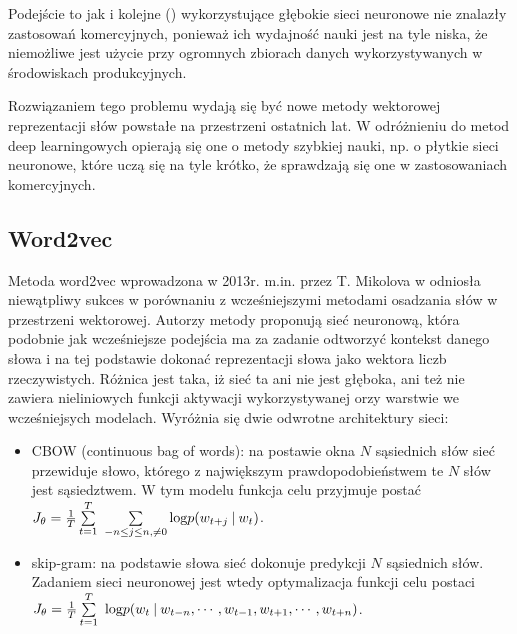 \documentclass[pl]{minipw} %
\begin{document}
Podejście to jak i kolejne (\cite{c_w}) wykorzystujące głębokie sieci neuronowe nie znalazły zastosowań komercyjnych, ponieważ ich wydajność nauki jest na tyle  niska, że niemożliwe jest użycie przy ogromnych zbiorach danych wykorzystywanych w środowiskach produkcyjnych.


Rozwiązaniem tego problemu wydają się być nowe metody wektorowej reprezentacji słów powstałe na przestrzeni ostatnich lat. W odróżnieniu do metod deep learningowych opierają się one o metody szybkiej nauki, np. o płytkie sieci neuronowe, które uczą się na tyle krótko, że sprawdzają się one w zastosowaniach komercyjnych.


\subsection{Word2vec}%

Metoda word2vec wprowadzona w 2013r. m.in. przez T. Mikolova w \cite{word2vec} odniosła niewątpliwy sukces w porównaniu z wcześniejszymi metodami osadzania słów w przestrzeni wektorowej. Autorzy metody proponują sieć neuronową, która podobnie jak wcześniejsze podejścia ma za zadanie odtworzyć kontekst danego słowa i na tej podstawie dokonać reprezentacji słowa jako wektora liczb rzeczywistych. Różnica jest taka, iż sieć ta ani nie jest głęboka, ani też nie zawiera nieliniowych funkcji aktywacji wykorzystywanej orzy warstwie we wcześniejsych modelach. Wyróżnia się dwie odwrotne architektury sieci:
\begin{itemize}
	\item CBOW (continuous bag of words): na postawie okna $N$ sąsiednich słów sieć przewiduje słowo, którego z największym prawdopodobieństwem te $N$ słów jest sąsiedztwem. W tym modelu funkcja celu przyjmuje postać $J_\theta = \frac{1}{T}\sum\limits_{t=1}^T\ \sum\limits_{-n \leq j \leq n , \neq 0} \text{log} \space p(w_{t+j} \: | \: w_t)$.
	\item skip-gram: na podstawie słowa sieć dokonuje predykcji $N$ sąsiednich słów. Zadaniem sieci neuronowej jest wtedy optymalizacja funkcji celu postaci $J_\theta = \frac{1}{T}\sum\limits_{t=1}^T\ \text{log} \space p(w_t \: | \: w_{t-n} , \cdots , w_{t-1}, w_{t+1}, \cdots , w_{t+n})$.
\end{itemize}
\end{document}
